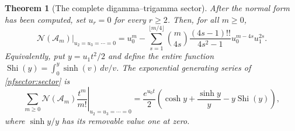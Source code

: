 \documentclass[11pt,a4paper]{article}
\numberwithin{equation}{section}
\newtheorem{theorem}{Theorem}[section]
\theoremstyle{definition}
\theoremstyle{remark}
\begin{document}
\begin{theorem}[The complete digamma--trigamma sector]
\label{nfsector:trigamma}
After the normal form has been computed, set $u_r=0$ for every $r\ge2$.
Then, for all $m\ge0$,
\begin{equation}\label{nfsector:sector}
 \left.\mathcal N(\mathcal A_m)\right|_{u_2=u_3=\cdots=0}
 =u_0^m-
 \sum_{s=1}^{\lfloor m/4\rfloor}
 \binom{m}{4s}\frac{(4s-1)!!}{4s^2-1}
       u_0^{m-4s}u_1^{2s}.
\end{equation}
Equivalently, put $y=u_1t^2/2$ and define the entire function
$\operatorname{Shi}(y)=\int_0^y\sinh(v)\,dv/v$.  The exponential
generating series of \eqref{nfsector:sector} is
\begin{equation}\label{nfsector:Shi}
 \left.\sum_{m\ge0}\mathcal N(\mathcal A_m)\frac{t^m}{m!}
       \right|_{u_2=u_3=\cdots=0}
 =\frac{e^{u_0t}}2
       \left(\cosh y+\frac{\sinh y}{y}-y\operatorname{Shi}(y)\right),
\end{equation}
where $\sinh y/y$ has its removable value one at zero.
\end{theorem}
\end{document}
